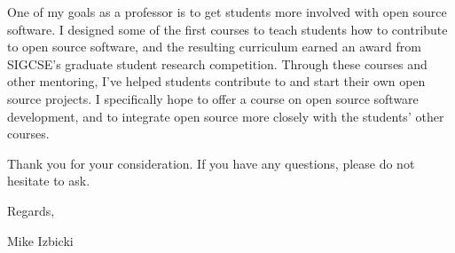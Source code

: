 \documentclass[12pt]{article}
\newcommand{\school}[2]{\textcolor{red}{\textbf{{#1}:} {#2}}}
\begin{document}
\noindent
One of my goals as a professor is to get students more involved with open source software.
I designed some of the first courses to teach students how to contribute to open source software,
and the resulting curriculum earned an award from SIGCSE's graduate student research competition.
Through these courses and other mentoring, 
I've helped students contribute to and start their own open source projects.
I specifically hope to offer a course on open source software development,
and to integrate open source more closely with the students' other courses.

\noindent
Thank you for your consideration.
If you have any questions,
please do not hesitate to ask.

\noindent
Regards,

\vspace{-0.15in}
\noindent
Mike Izbicki

%
%
%
%
%
\end{document}
